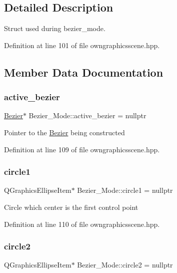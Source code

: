 \subsection{Detailed Description}
Struct used during bezier\+\_\+mode. 

Definition at line 101 of file owngraphicsscene.\+hpp.



\subsection{Member Data Documentation}
\mbox{\label{structBezier__Mode_a9aefbd869ef59854732e405886d334fb}} 
\subsubsection{\texorpdfstring{active\+\_\+bezier}{active\_bezier}}
{\footnotesize\ttfamily \mbox{\hyperlink{classBezier}{Bezier}}$\ast$ Bezier\+\_\+\+Mode\+::active\+\_\+bezier = nullptr}

Pointer to the \mbox{\hyperlink{classBezier}{Bezier}} being constructed 

Definition at line 109 of file owngraphicsscene.\+hpp.

\mbox{\label{structBezier__Mode_ab07833315488dc0d3c6f613c51de1d3f}} 
\subsubsection{\texorpdfstring{circle1}{circle1}}
{\footnotesize\ttfamily Q\+Graphics\+Ellipse\+Item$\ast$ Bezier\+\_\+\+Mode\+::circle1 = nullptr}

Circle which center is the first control point 

Definition at line 110 of file owngraphicsscene.\+hpp.

\mbox{\label{structBezier__Mode_a3f6f2bdade3db15c0855820d86a5b98e}} 
\subsubsection{\texorpdfstring{circle2}{circle2}}
{\footnotesize\ttfamily Q\+Graphics\+Ellipse\+Item$\ast$ Bezier\+\_\+\+Mode\+::circle2 = nullptr}

